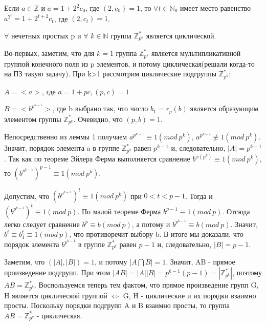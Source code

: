 \begin{lemma}
	Если $a \in \mathbb{Z}$ и $a = 1 + 2^{2}c_{0}$, где $(2,c_{0}) = 1$, то $\forall t \in \mathbb{N}_{0}$ имеет место равенство
	$a^{2^{t}} = 1+2^{t+2}c_{t}$, где $(2,c_{t})=1$.
\end{lemma}

\begin{proofs}
	$\forall$ нечетных простых p и $\forall$ $k \in \mathbb{N}$ группа $\mathbb{Z}_{p^{k}}^{*}$ является циклической.
	\begin{dokvo}
		Во-первых, заметим, что для $k=1$ группа $\mathbb{Z}_{p^{k}}^{*}$ является мультипликативной группой конечного поля из p элементов, и потому циклическая(решали когда-то на ПЗ такую задачу). При k>1 рассмотрим циклические подгруппы $\mathbb{Z}_{p^{k}}^{*}$:
		\begin{enumerate*}
			\item $A=<a>$, где $a = 1 + pc, (p,c) = 1$
			\item $B=<b^{p^{k-1}}>$, где b выбрано так, что число $b_{1} = r_{p}(b)$ является образующим элементом группы $\mathbb{Z}_{p^{k}}^{*}$. Очевидно, что $(p,b)=1$.
		\end{enumerate*}
		Непосредственно из леммы 1 получаем $a^{p^{k-1}} \equiv 1 (mod\ p^{k})$, $a^{p^{k-2}} \not\equiv 1 (mod\ p^{k})$. Значит, порядок элемента a в группе $\mathbb{Z}_{p^{k}}^{*}$ равен $p^{k-1}$ и, следовательно, $|A| = p^{k-1}$.
		Так как по теореме Эйлера Ферма выполняется сравнение $b^{\phi(p^{k})} \equiv 1 (mod\ p^{k})$, то $(b^{p^{k-1}})^{p-1} \equiv 1 (mod\ p^{k})$.

		Допустим, что $(b^{p^{k-1}})^t \equiv 1(mod\ p^{k})$ при $0 < t < p-1$. Тогда и $(b^{p^{k-1}})^t \equiv 1(mod\ p)$. По малой теореме Ферма $b^{p-1} \equiv 1 (mod\ p)$. Отсюда легко следует сравнение $b^{p} \equiv b (mod\ p)$, а потому и $b^{p^{k-1}} \equiv b (mod\ p)$. Значит, $b^t \equiv b^{t}_{1} \equiv 1 (mod\ p)$, что противоречит выбору b. В итоге мы доказали, что порядок элемента $b^{p^{k-1}}$ в группе $\mathbb{Z}_{p^{k}}^{*}$ равен $p-1$ и, следовательно, $|B| = p-1$.

		Заметим, что $(|A|,|B|) = 1$, и потому $|A \bigcap B|=1$. Значит, AB - прямое произведение подгрупп. При этом $|AB|=|A||B|=p^{k-1}(p-1)=|\mathbb{Z}_{p^{k}}^{*}|$, поэтому $AB = \mathbb{Z}_{p^{k}}^{*}$.
		Воспользуемся теперь тем фактом, что прямое произведение групп G, H является циклической группой $\Leftrightarrow$ G, H - циклические и их порядки взаимно просты.
		Поскольку порядки подгрупп A и B взаимно просты, то группа $AB = \mathbb{Z}_{p^{k}}^{*}$ - циклическая.
	\end{dokvo}
\end{proofs}

